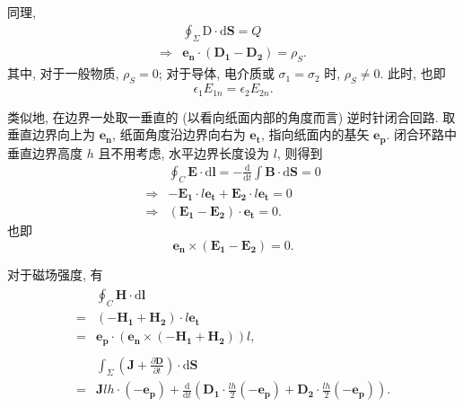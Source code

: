 同理,
\begin{equation} \label{eq:3.1 basic 2}
    \begin{aligned}
                    & \oint_\Sigma\mathrm{D}\cdot\mathrm{d}\bm{S}=Q \\
        \Rightarrow & \bm{e_n}\cdot(\bm{D_1}-\bm{D_2})=\rho_S.
    \end{aligned}
\end{equation}
其中, 对于一般物质, $\rho_S=0$; 对于导体, 电介质或 $\sigma_1=\sigma_2$ 时, $\rho_S\neq0$. 此时, 也即
\begin{equation}
    \epsilon_1E_{1n}=\epsilon_2E_{2n}.
\end{equation}

类似地, 在边界一处取一垂直的 (以看向纸面内部的角度而言) 逆时针闭合回路. 取垂直边界向上为 $\bm{e_n}$, 纸面角度沿边界向右为 $\bm{e_t}$, 指向纸面内的基矢 $\bm{e_p}$. 闭合环路中垂直边界高度 $h$ 且不用考虑, 水平边界长度设为 $l$, 则得到
\begin{equation*}
    \begin{aligned}
                    & \oint_C\bm{E}\cdot\mathrm{d}\bm{l}=-\frac{\mathrm{d}}{\mathrm{d}t}\int\bm{B}\cdot\mathrm{d}\bm{S}=0 \\
        \Rightarrow & -\bm{E_1}\cdot l\bm{e_t}+\bm{E_2}\cdot l\bm{e_t}=0                                                  \\
        \Rightarrow & (\bm{E_1}-\bm{E_2})\cdot\bm{e_t}=0.
    \end{aligned}
\end{equation*}
也即
\begin{equation} \label{eq:3.1 basic 3}
    \bm{e_n}\times(\bm{E_1}-\bm{E_2})=0.
\end{equation}

对于磁场强度, 有
\begin{gather}
    \begin{aligned}
          & \oint_C\bm{H}\cdot\mathrm{d}\bm{l}                  \\
        = & (-\bm{H_1}+\bm{H_2})\cdot l\bm{e_t}                 \\
        = & \bm{e_p}\cdot(\bm{e_n}\times(-\bm{H_1}+\bm{H_2}))l,
    \end{aligned} \\
    \begin{aligned} \label{eq:3.1 6}
          & \int_\Sigma\left(\bm{J}+\frac{\partial\bm{D}}{\partial t}\right)\cdot\mathrm{d}\bm{S}                                                          \\
        = & \bm{J}lh\cdot(-\bm{e_p})+\frac{\mathrm{d}}{\mathrm{d}t}\left(\bm{D_1}\cdot\frac{lh}{2}(-\bm{e_p})+\bm{D_2}\cdot\frac{lh}{2}(-\bm{e_p})\right).
    \end{aligned}
\end{gather}

